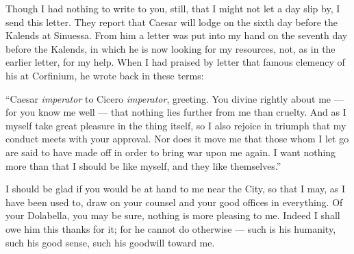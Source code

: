 

 Though I had nothing to write to you, still, that I might not let a day slip by, I send this letter. They report that Caesar will lodge on the sixth day before the Kalends at Sinuessa. From him a letter was put into my hand on the seventh day before the Kalends, in which he is now looking for my resources, not, as in the earlier letter, for my help. When I had praised by letter that famous clemency of his at Corfinium, he wrote back in these terms:

 ``Caesar \textit{imperator} to Cicero \textit{imperator}, greeting. You divine rightly about me --- for you know me well --- that nothing lies further from me than cruelty. And as I myself take great pleasure in the thing itself, so I also rejoice in triumph that my conduct meets with your approval. Nor does it move me that those whom I let go are said to have made off in order to bring war upon me again. I want nothing more than that I should be like myself, and they like themselves.''

 I should be glad if you would be at hand to me near the City, so that I may, as I have been used to, draw on your counsel and your good offices in everything. Of your Dolabella, you may be sure, nothing is more pleasing to me. Indeed I shall owe him this thanks for it; for he cannot do otherwise --- such is his humanity, such his good sense, such his goodwill toward me.
